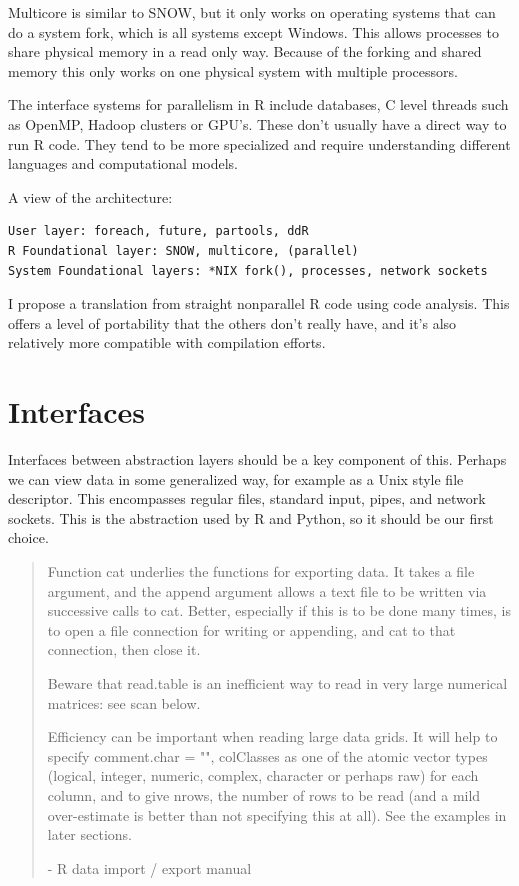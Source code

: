 \documentclass[12pt]{article}
\begin{document}
Multicore is similar to SNOW, but it only works on operating systems that can
do a system fork, which is all systems except Windows. This allows
processes to share physical memory in a read only way. Because of the
forking and shared memory this only works on one physical system with
multiple processors.

The interface systems for parallelism in R include databases, C level
threads such as OpenMP, Hadoop clusters or GPU's. These don't usually have
a direct way to run R code. They tend to be more specialized and require
understanding different languages and computational models.

A view of the architecture:

\begin{verbatim}
User layer: foreach, future, partools, ddR
R Foundational layer: SNOW, multicore, (parallel)
System Foundational layers: *NIX fork(), processes, network sockets
\end{verbatim}

I propose a translation from straight nonparallel R code using code
analysis. This offers a level of portability that the others don't really
have, and it's also relatively more compatible with compilation efforts.

\section{Interfaces}

Interfaces between abstraction layers should be a key component of this.
Perhaps we can view data in some generalized way, for example as a Unix
style file descriptor. This encompasses regular files, standard input,
pipes, and network sockets. This is the abstraction used by R and Python,
so it should be our first choice.

\begin{quote}

Function cat underlies the functions for exporting data. It takes a file
    argument, and the append argument allows a text file to be written via
    successive calls to cat. Better, especially if this is to be done many
    times, is to open a file connection for writing or appending, and cat
    to that connection, then close it.

Beware that read.table is an inefficient way to read in very large
numerical matrices: see scan below.

Efficiency can be important when reading large data grids. It will help to
    specify comment.char = "", colClasses as one of the atomic vector types
    (logical, integer, numeric, complex, character or perhaps raw) for each
    column, and to give nrows, the number of rows to be read (and a mild
    over-estimate is better than not specifying this at all). See the
    examples in later sections.

- R data import / export manual
\end{quote}
\end{document}
